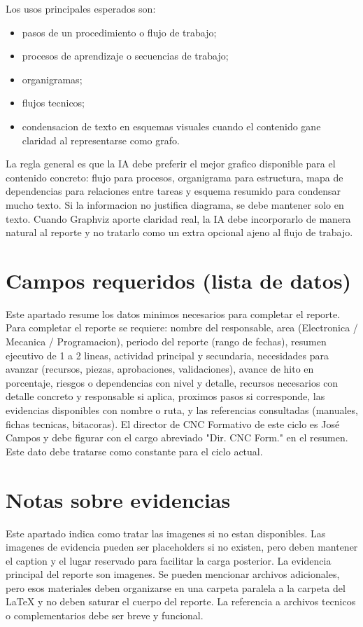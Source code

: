 \documentclass[11pt,a4paper]{article}
\begin{document}
Los usos principales esperados son:
\begin{itemize}
  \item pasos de un procedimiento o flujo de trabajo;
  \item procesos de aprendizaje o secuencias de trabajo;
  \item organigramas;
  \item flujos tecnicos;
  \item condensacion de texto en esquemas visuales cuando el contenido gane
  claridad al representarse como grafo.
\end{itemize}

La regla general es que la IA debe preferir el mejor grafico disponible para el
contenido concreto: flujo para procesos, organigrama para estructura, mapa de
dependencias para relaciones entre tareas y esquema resumido para condensar
mucho texto. Si la informacion no justifica diagrama, se debe mantener solo en
texto. Cuando Graphviz aporte claridad real, la IA debe incorporarlo de manera
natural al reporte y no tratarlo como un extra opcional ajeno al flujo de
trabajo.

\section{Campos requeridos (lista de datos)}
Este apartado resume los datos minimos necesarios para completar el reporte.
Para completar el reporte se requiere: nombre del responsable, area
(Electronica / Mecanica / Programacion), periodo del reporte (rango de fechas),
resumen ejecutivo de 1 a 2 lineas, actividad principal y secundaria,
necesidades para avanzar (recursos, piezas, aprobaciones, validaciones), avance
de hito en porcentaje, riesgos o dependencias con nivel y detalle, recursos
necesarios con detalle concreto y responsable si aplica, proximos pasos si
corresponde, las evidencias disponibles con nombre o ruta, y las referencias
consultadas (manuales, fichas tecnicas, bitacoras).
El director de CNC Formativo de este ciclo es José Campos y debe figurar con el
cargo abreviado "Dir. CNC Form." en el resumen. Este dato debe tratarse como
constante para el ciclo actual.

\section{Notas sobre evidencias}
Este apartado indica como tratar las imagenes si no estan disponibles. Las
imagenes de evidencia pueden ser placeholders si no existen, pero deben
mantener el caption y el lugar reservado para facilitar la carga posterior.
La evidencia principal del reporte son imagenes. Se pueden mencionar archivos
adicionales, pero esos materiales deben organizarse en una carpeta paralela a
la carpeta del LaTeX y no deben saturar el cuerpo del reporte. La referencia a
archivos tecnicos o complementarios debe ser breve y funcional.
\end{document}
